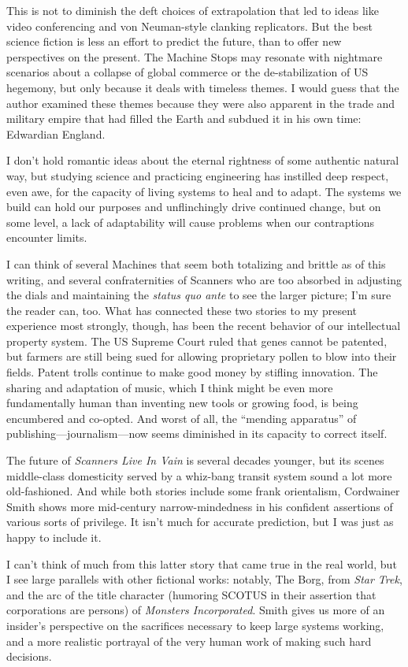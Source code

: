 This is not to diminish the deft choices of extrapolation that led to ideas like video conferencing and von Neuman-style clanking replicators. But the best science fiction is less an effort to predict the future, than to offer new perspectives on the present. The Machine Stops may resonate with nightmare scenarios about a collapse of global commerce or the de-stabilization of US hegemony, but only because it deals with timeless themes. I would guess that the author examined these themes because they were also apparent in the trade and military empire that had filled the Earth and subdued it in his own time: Edwardian England.

I don't hold romantic ideas about the eternal rightness of some authentic natural way, but studying science and practicing engineering has instilled deep respect, even awe, for the capacity of living systems to heal and to adapt. The systems we build can hold our purposes and unflinchingly drive continued change, but on some level, a lack of adaptability will cause problems when our contraptions encounter limits. 

I can think of several Machines that seem both totalizing and brittle as of this writing, and several confraternities of Scanners who are too absorbed in adjusting the dials and maintaining the \textit{status quo ante} to see the larger picture; I'm sure the reader can, too. What has connected these two stories to my present experience most strongly, though, has been the recent behavior of our intellectual property system. The US Supreme Court ruled that genes cannot be patented, but farmers are still being sued for allowing proprietary pollen to blow into their fields. Patent trolls continue to make good money by stifling innovation. The sharing and adaptation of music, which I think might be even more fundamentally human than inventing new tools or growing food, is being encumbered and co-opted. And worst of all, the ``mending apparatus'' of publishing---journalism---now seems diminished in its capacity to correct itself.

The future of \emph{Scanners Live In Vain} is several decades younger, but its scenes middle-class domesticity served by a whiz-bang transit system sound a lot more old-fashioned. And while both stories include some frank orientalism, Cordwainer Smith shows more mid-century narrow-mindedness in his confident assertions of various sorts of privilege. It isn't much for accurate prediction, but I was just as happy to include it.

I can't think of much from this latter story that came true in the real world, but I see large parallels with other fictional works: notably, The Borg, from \emph{Star Trek}, and the arc of the title character (humoring SCOTUS in their assertion that corporations are persons) of \emph{Monsters Incorporated}. Smith gives us more of an insider's perspective on the sacrifices necessary to keep large systems working, and a more realistic portrayal of the very human work of making such hard decisions. 

